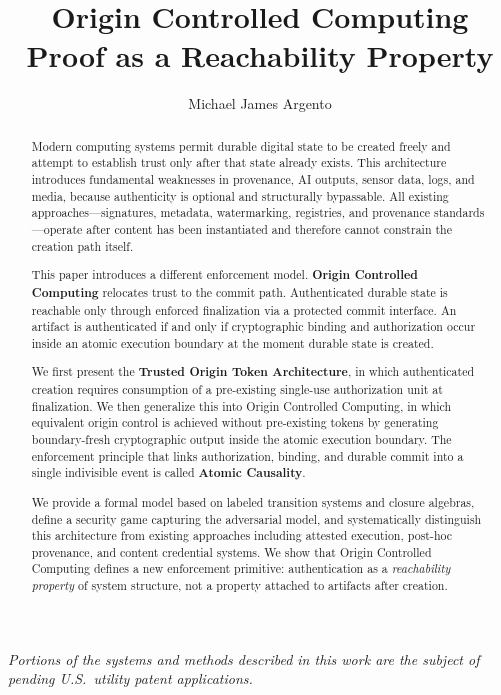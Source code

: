 \documentclass[11pt,letterpaper]{article}
\title{%
  \textbf{Origin Controlled Computing}\\[6pt]
  \large Proof as a Reachability Property%
}
\author{Michael James Argento}
\date{}
\theoremstyle{occplain}
\theoremstyle{occremark}
\begin{document}
\maketitle

\begin{abstract}
Modern computing systems permit durable digital state to be created freely and attempt to establish trust only after that state already exists. This architecture introduces fundamental weaknesses in provenance, AI outputs, sensor data, logs, and media, because authenticity is optional and structurally bypassable. All existing approaches---signatures, metadata, watermarking, registries, and provenance standards---operate after content has been instantiated and therefore cannot constrain the creation path itself.

This paper introduces a different enforcement model. \textbf{Origin Controlled Computing} relocates trust to the commit path. Authenticated durable state is reachable only through enforced finalization via a protected commit interface. An artifact is authenticated if and only if cryptographic binding and authorization occur inside an atomic execution boundary at the moment durable state is created.

We first present the \textbf{Trusted Origin Token Architecture}, in which authenticated creation requires consumption of a pre-existing single-use authorization unit at finalization. We then generalize this into Origin Controlled Computing, in which equivalent origin control is achieved without pre-existing tokens by generating boundary-fresh cryptographic output inside the atomic execution boundary. The enforcement principle that links authorization, binding, and durable commit into a single indivisible event is called \textbf{Atomic Causality}.

We provide a formal model based on labeled transition systems and closure algebras, define a security game capturing the adversarial model, and systematically distinguish this architecture from existing approaches including attested execution, post-hoc provenance, and content credential systems. We show that Origin Controlled Computing defines a new enforcement primitive: authentication as a \emph{reachability property} of system structure, not a property attached to artifacts after creation.
\end{abstract}

\medskip
\noindent\textit{\small Portions of the systems and methods described in this work are the subject of pending U.S.\ utility patent applications.}
\end{document}
